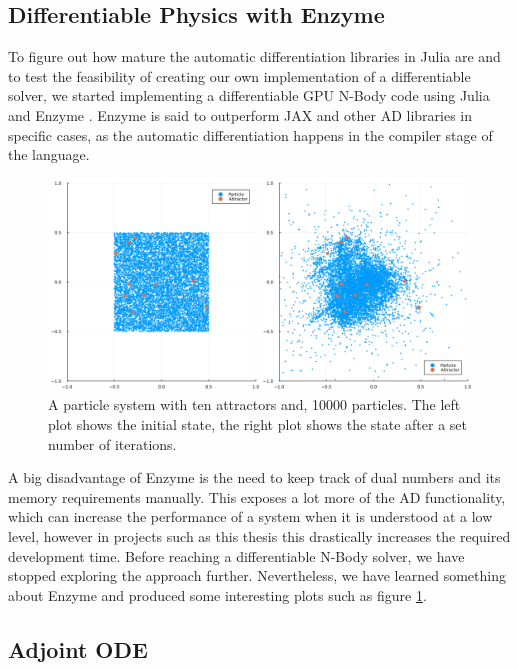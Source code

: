 \documentclass{article}
\begin{document}
{\begin{appendices}
\subsection{Differentiable Physics with Enzyme}
\label{diff-julia}

To figure out how mature the automatic differentiation libraries in Julia are and to test the feasibility of creating our own implementation of a differentiable solver, we started implementing a differentiable GPU N-Body code using Julia and Enzyme \citep{enzyme1, enzyme2, enzyme3}. Enzyme is said to outperform {JAX} and other AD libraries in specific cases, as the automatic differentiation happens in the compiler stage of the language.

\begin{figure}[h]
    \centering
    \includegraphics[width=0.9\linewidth]{img/particles.png}
    \caption{A particle system with ten attractors and, 10000 particles. The left plot shows the initial state, the right plot shows the state after a set number of iterations.}
    \label{fig:enzyme}
\end{figure}

A big disadvantage of Enzyme is the need to keep track of dual numbers and its memory requirements manually. This exposes a lot more of the AD functionality, which can increase the performance of a system when it is understood at a low level, however in projects such as this thesis this drastically increases the required development time. Before reaching a differentiable N-Body solver, we have stopped exploring the approach further. Nevertheless, we have learned something about Enzyme and produced some interesting plots such as figure \ref{fig:enzyme}.

\subsection{Adjoint ODE}
\label{adj-ode}


\end{appendices}}
\end{document}
